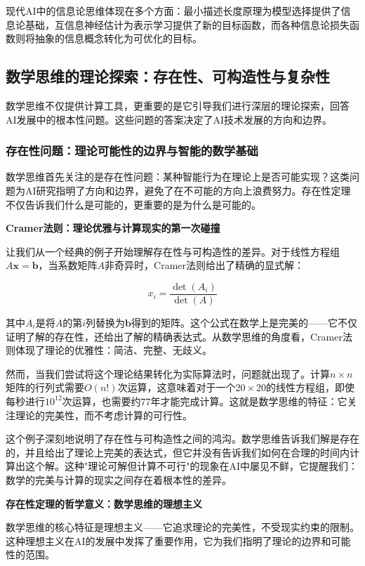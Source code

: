 现代AI中的信息论思维体现在多个方面：最小描述长度原理为模型选择提供了信息论基础，互信息神经估计为表示学习提供了新的目标函数，而各种信息论损失函数则将抽象的信息概念转化为可优化的目标。

\subsection{数学思维的理论探索：存在性、可构造性与复杂性}

数学思维不仅提供计算工具，更重要的是它引导我们进行深层的理论探索，回答AI发展中的根本性问题。这些问题的答案决定了AI技术发展的方向和边界。

\subsubsection{存在性问题：理论可能性的边界与智能的数学基础}

数学思维首先关注的是存在性问题：某种智能行为在理论上是否可能实现？这类问题为AI研究指明了方向和边界，避免了在不可能的方向上浪费努力。存在性定理不仅告诉我们什么是可能的，更重要的是为什么是可能的。

\textbf{Cramer法则：理论优雅与计算现实的第一次碰撞}

让我们从一个经典的例子开始理解存在性与可构造性的差异。对于线性方程组$A\mathbf{x} = \mathbf{b}$，当系数矩阵$A$非奇异时，Cramer法则给出了精确的显式解：

$$x_i = \frac{\det(A_i)}{\det(A)}$$

其中$A_i$是将$A$的第$i$列替换为$\mathbf{b}$得到的矩阵。这个公式在数学上是完美的——它不仅证明了解的存在性，还给出了解的精确表达式。从数学思维的角度看，Cramer法则体现了理论的优雅性：简洁、完整、无歧义。

然而，当我们尝试将这个理论结果转化为实际算法时，问题就出现了。计算$n \times n$矩阵的行列式需要$O(n!)$次运算，这意味着对于一个$20 \times 20$的线性方程组，即使每秒进行$10^{12}$次运算，也需要约$77$年才能完成计算。这就是数学思维的特征：它关注理论的完美性，而不考虑计算的可行性。

这个例子深刻地说明了存在性与可构造性之间的鸿沟。数学思维告诉我们解是存在的，并且给出了理论上完美的表达式，但它并没有告诉我们如何在合理的时间内计算出这个解。这种"理论可解但计算不可行"的现象在AI中屡见不鲜，它提醒我们：数学的完美与计算的现实之间存在着根本性的差异。

\textbf{存在性定理的哲学意义：数学思维的理想主义}

数学思维的核心特征是理想主义——它追求理论的完美性，不受现实约束的限制。这种理想主义在AI的发展中发挥了重要作用，它为我们指明了理论的边界和可能性的范围。


